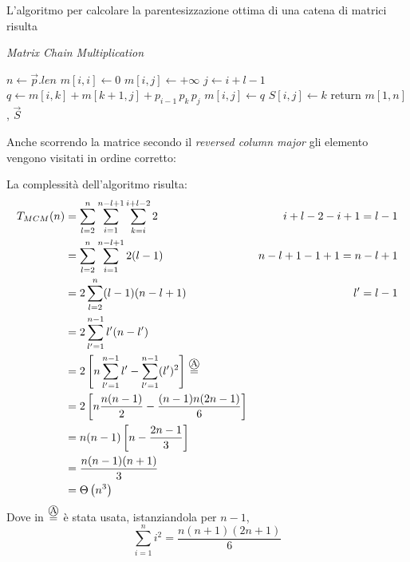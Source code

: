 L'algoritmo per calcolare la parentesizzazione ottima di una catena di matrici risulta
\begin{algorithm}[H]
\caption{\emph{Matrix Chain Multiplication}}\label{alg:mcmit}
\begin{algorithmic}[1]
    \State $n \gets \vec{p}.len$
        \State $m[i,i] \gets 0$
    \EndFor
            \State $m[i,j] \gets +\infty$
            \label{alg:mcmit:initmij}
            \State $j \gets i+l-1$
                \State $q \gets m[i,k]+m[k+1,j]+ p_{i-1} \, p_k \, p_j$
                    \State $m[i,j] \gets q$
                    \State $S[i,j] \gets k$
                \EndIf
            \EndFor
        \EndFor
    \EndFor
    \State return $m[1,n]$, $\vec{S}$
\EndProcedure
\end{algorithmic}
\end{algorithm}

Anche scorrendo la matrice secondo il \emph{reversed column major} gli elemento vengono visitati in ordine corretto:
\begin{algorithmic}[1]
        \EndFor
    \EndFor
\end{algorithmic}

La complessità dell'algoritmo risulta:
\begin{align*}
    T_{MCM}(n) 
    &= \sum_{l=2}^{n} \sum_{i=1}^{n-l+1} \sum_{k=i}^{i+l-2} 2
    & i+l-2-i+1 = l-1 &\\
    &= \sum_{l=2}^{n} \sum_{i=1}^{n-l+1} 2 (l-1)
    & n-l+1-1+1 = n-l+1 &\\
    &= 2 \sum_{l=2}^{n} (l-1) (n-l+1)
    & l'=l-1 &\\
    &= 2 \sum_{l'=1}^{n-1} l' (n-l')
    \\
    &= 2 \left[ n \sum_{l'=1}^{n-1} l' - \sum_{l'=1}^{n-1} (l')^2\right]
    \overset{\mbox{\textcircled{\footnotesize A}}}{=}
    \\
    &= 2 \left[ n \frac{n(n-1)}{2} - \frac{(n-1)n(2n-1)}{6}\right]
    \\
    &= n(n-1) \left[ n - \frac{2n-1}{3}\right]
    \\
    &= \frac{n(n-1)(n+1)}{3}
    \\
    &= \Theta \left( n^3 \right)
\end{align*}
Dove in $\overset{\mbox{\textcircled{\footnotesize A}}}{=}$ è stata usata, istanziandola per $n-1$,
\begin{equation*}
    \sum_{i=1}^{n} i^2 = \frac{n(n+1)(2n+1)}{6}
\end{equation*}

